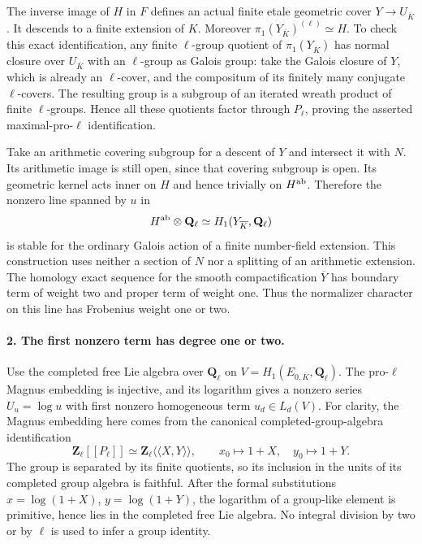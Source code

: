 The inverse image of $H$ in $F$ defines an actual finite etale geometric cover $Y\to U_{\overline K}$. It descends to a finite extension of $K$. Moreover $\pi_1(Y_{\overline K})^{(\ell)}\simeq H$. To check this exact identification, any finite $\ell$-group quotient of $\pi_1(Y_{\overline K})$ has normal closure over $U_{\overline K}$ with an $\ell$-group as Galois group: take the Galois closure of $Y$, which is already an $\ell$-cover, and the compositum of its finitely many conjugate $\ell$-covers. The resulting group is a subgroup of an iterated wreath product of finite $\ell$-groups. Hence all these quotients factor through $P_\ell$, proving the asserted maximal-pro-$\ell$ identification.

Take an arithmetic covering subgroup for a descent of $Y$ and intersect it with $N$. Its arithmetic image is still open, since that covering subgroup is open. Its geometric kernel acts inner on $H$ and hence trivially on $H^{\rm ab}$. Therefore the nonzero line spanned by $u$ in
\[
 H^{\rm ab}\otimes\mathbf Q_\ell
 \simeq H_1(Y_{\overline K},\mathbf Q_\ell)
\]
is stable for the ordinary Galois action of a finite number-field extension. This construction uses neither a section of $N$ nor a splitting of an arithmetic extension. The homology exact sequence for the smooth compactification $\overline Y$ has boundary term of weight two and proper term of weight one. Thus the normalizer character on this line has Frobenius weight one or two.

\paragraph{2. The first nonzero term has degree one or two.}
Use the completed free Lie algebra over $\mathbf Q_\ell$ on $V=H_1(E_{0,\overline K},\mathbf Q_\ell)$. The pro-$\ell$ Magnus embedding is injective, and its logarithm gives a nonzero series $U_u=\log u$ with first nonzero homogeneous term $u_d\in L_d(V)$. For clarity, the Magnus embedding here comes from the canonical completed-group-algebra identification
\[
 \mathbf Z_\ell[[P_\ell]]\simeq\mathbf Z_\ell\langle\!\langle X,Y\rangle\!\rangle,
 \qquad x_0\mapsto1+X,\quad y_0\mapsto1+Y.
\]
The group is separated by its finite quotients, so its inclusion in the units of its completed group algebra is faithful. After the formal substitutions $x=\log(1+X)$, $y=\log(1+Y)$, the logarithm of a group-like element is primitive, hence lies in the completed free Lie algebra. No integral division by two or by $\ell$ is used to infer a group identity.

